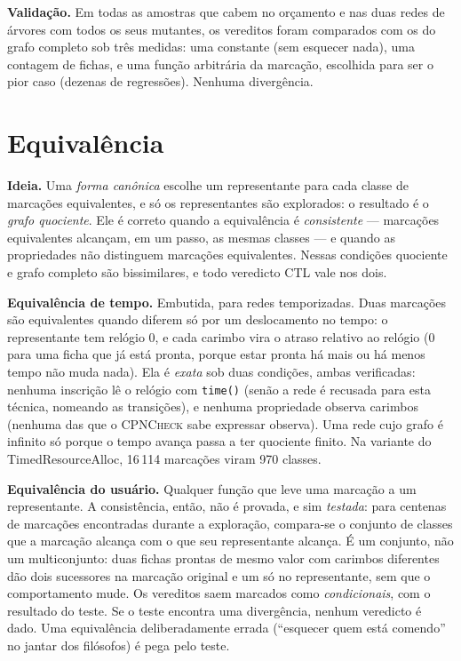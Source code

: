 \documentclass[11pt,a4paper]{report}
\newcommand{\cpn}{\textsc{CPNCheck}}
\newcommand{\code}[1]{\texttt{\small #1}}
\theoremstyle{definition}
\begin{document}
\textbf{Validação.} Em todas as amostras que cabem no orçamento e nas duas
redes de árvores com todos os seus mutantes, os vereditos foram comparados com
os do grafo completo sob três medidas: uma constante (sem esquecer nada), uma
contagem de fichas, e uma função arbitrária da marcação, escolhida para ser o
pior caso (dezenas de regressões). Nenhuma divergência.

\section{Equivalência}

\textbf{Ideia.} Uma \emph{forma canônica} escolhe um representante para cada
classe de marcações equivalentes, e só os representantes são explorados: o
resultado é o \emph{grafo quociente}. Ele é correto quando a equivalência é
\emph{consistente} --- marcações equivalentes alcançam, em um passo, as mesmas
classes --- e quando as propriedades não distinguem marcações equivalentes.
Nessas condições quociente e grafo completo são bissimilares, e todo veredicto
CTL vale nos dois.

\textbf{Equivalência de tempo.} Embutida, para redes temporizadas. Duas
marcações são equivalentes quando diferem só por um deslocamento no tempo: o
representante tem relógio 0, e cada carimbo vira o atraso relativo ao relógio
(0 para uma ficha que já está pronta, porque estar pronta há mais ou há menos
tempo não muda nada). Ela é \emph{exata} sob duas condições, ambas
verificadas: nenhuma inscrição lê o relógio com \code{time()} (senão a rede é
recusada para esta técnica, nomeando as transições), e nenhuma propriedade
observa carimbos (nenhuma das que o \cpn{} sabe expressar observa). Uma rede
cujo grafo é infinito só porque o tempo avança passa a ter quociente finito.
Na variante do TimedResourceAlloc, 16\,114 marcações viram 970 classes.

\textbf{Equivalência do usuário.} Qualquer função que leve uma marcação a um
representante. A consistência, então, não é provada, e sim \emph{testada}:
para centenas de marcações encontradas durante a exploração, compara-se o
conjunto de classes que a marcação alcança com o que seu representante
alcança. É um conjunto, não um multiconjunto: duas fichas prontas de mesmo
valor com carimbos diferentes dão dois sucessores na marcação original e um só
no representante, sem que o comportamento mude. Os vereditos saem marcados
como \emph{condicionais}, com o resultado do teste. Se o teste encontra uma
divergência, nenhum veredicto é dado. Uma equivalência deliberadamente errada
(``esquecer quem está comendo'' no jantar dos filósofos) é pega pelo teste.
\end{document}
